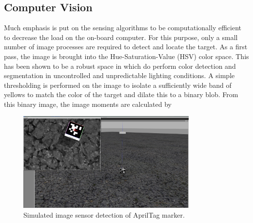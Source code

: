 \documentclass[]{aiaa-tc}
\begin{document}
\subsection{Computer Vision}
Much emphasis is put on the sensing algorithms to be computationally efficient to decrease the load on the on-board computer. For this purpose, only a small number of image processes are required to detect and locate the target. As a first pass, the image is brought into the Hue-Saturation-Value (HSV) color space. This has been shown to be a robust space in which do perform color detection and segmentation in uncontrolled and unpredictable lighting conditions\cite{zhao2002robust}. A simple thresholding is performed on the image to isolate a sufficiently wide band of yellows to match the color of the target and dilate this to a binary blob. From this binary image, the image moments are calculated by
\begin{figure}[ht]
\centering
\includegraphics[width=0.8\textwidth]{images/rs_working_apriltags_crop.png}
\caption{Simulated image sensor detection of AprilTag marker.}\label{f:apriltag}
\end{figure}
\end{document}
